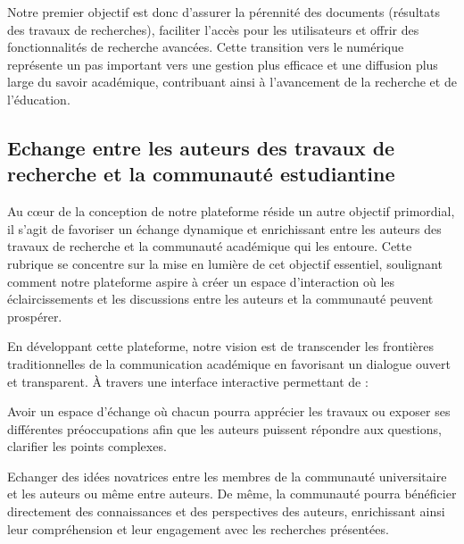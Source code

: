 Notre premier objectif est donc d’assurer la pérennité des documents (résultats des travaux de recherches), faciliter l’accès pour les utilisateurs et offrir des fonctionnalités de recherche avancées. Cette transition vers le numérique représente un pas important vers une gestion plus efficace et une diffusion plus large du savoir académique, contribuant ainsi à l'avancement de la recherche et de l'éducation.
\par

\subsection{Echange entre les auteurs des travaux de recherche et la communauté estudiantine}
Au cœur de la conception de notre plateforme réside un autre objectif primordial, il s'agit de favoriser un échange dynamique et enrichissant entre les auteurs des travaux de recherche et la communauté académique qui les entoure. Cette rubrique se concentre sur la mise en lumière de cet objectif essentiel, soulignant comment notre plateforme aspire à créer un espace d'interaction où les éclaircissements et les discussions entre les auteurs et la communauté peuvent prospérer.

En développant cette plateforme, notre vision est de transcender les frontières traditionnelles de la communication académique en favorisant un dialogue ouvert et transparent. À travers une interface interactive permettant de :\par

	Avoir un espace d’échange où chacun pourra apprécier les travaux ou exposer ses différentes préoccupations afin que les auteurs puissent répondre aux questions, clarifier les points complexes.\par
	Echanger des idées novatrices entre les membres de la communauté universitaire et les auteurs ou même entre auteurs.
	De même, la communauté pourra bénéficier directement des connaissances et des perspectives des auteurs, enrichissant ainsi leur compréhension et leur engagement avec les recherches présentées.\par

